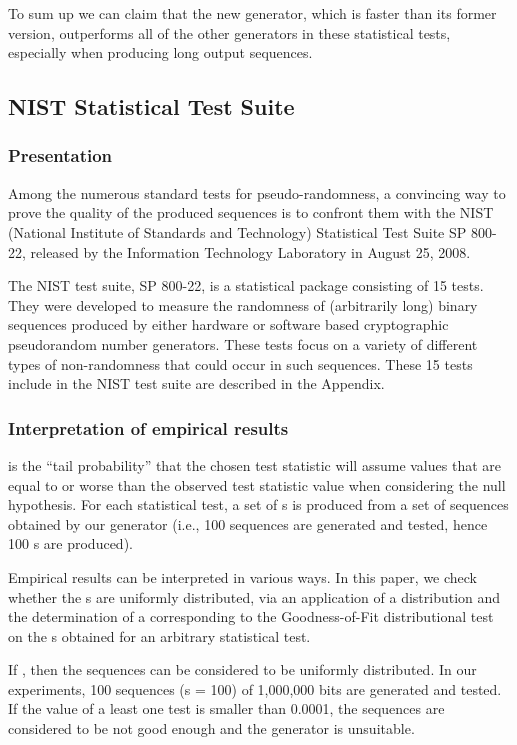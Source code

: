 \documentclass[journal]{IEEEtran}
\begin{document}
To sum up we can claim that the new generator, which is faster than its former version, outperforms all of the other generators in these statistical tests, especially when producing long output sequences.



\subsection{NIST Statistical Test Suite}

\subsubsection{Presentation}

Among the numerous standard tests for pseudo-randomness, a convincing way to prove the quality of the produced sequences is to confront them with the NIST (National Institute of Standards and Technology) Statistical Test Suite SP 800-22, released by the Information Technology Laboratory in August 25, 2008.

The NIST test suite, SP 800-22, is a statistical package consisting of 15 tests. They were developed to measure the randomness of (arbitrarily long) binary sequences produced by either hardware or software based cryptographic pseudorandom number generators. These tests focus on a variety of different types of non-randomness that could occur in such sequences. These 15 tests include in the NIST test suite are described in the Appendix.


\subsubsection{Interpretation of empirical results}

 is the ``tail probability'' that the chosen test statistic will assume values that are equal to or worse than the observed test statistic value when considering the null hypothesis.
For each statistical test, a set of s is produced from a set of sequences obtained by our generator (i.e., 100 sequences are generated and tested, hence 100 s are produced). 

Empirical results can be interpreted in various ways. In this paper, we check whether the s are uniformly distributed, via an application of
a  distribution and the determination of a 
corresponding to the Goodness-of-Fit distributional test
on the s obtained for an arbitrary statistical test. 

If , then the sequences can be considered to be uniformly distributed.
In our experiments, 100 sequences (s = 100) of 1,000,000 bits are generated and tested. If the value  of a least one test is smaller than 0.0001, the sequences are considered to be not good enough and the generator is unsuitable.
\end{document}
